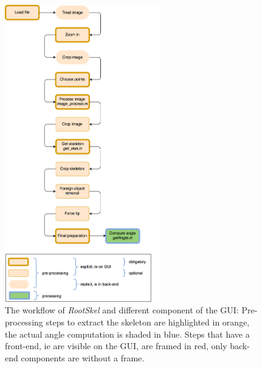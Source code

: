\begin{figure}[h]
	\centering
	\includegraphics[width=0.6\textwidth]{../Figures/workflow_big.png}
	\caption{The workflow of \textit{RootSkel} and different component of the GUI: Pre-processing steps to extract the skeleton are highlighted in orange, the actual angle computation is shaded in blue. Steps that have a front-end, ie are visible on the GUI, are framed in red, only back-end components are without a frame. }
	\label{fig:workflow}
\end{figure}


%
%
%
%
%
%
%
%



